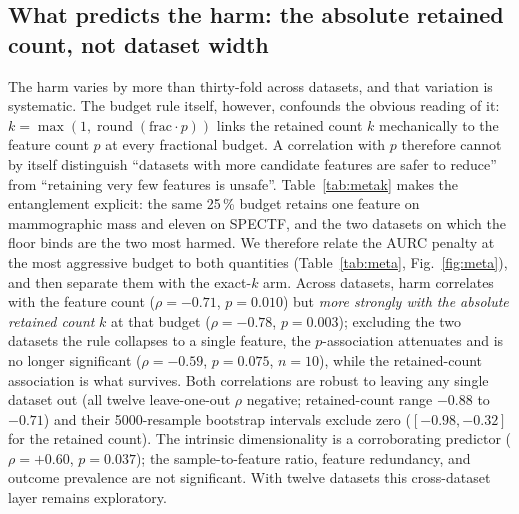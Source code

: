\documentclass[fleqn,10pt]{wlscirep}
\newcommand{\result}[1]{#1}
\begin{document}
\begin{table}[t]
\centering
\caption{The five new reliability axes at 25\,\% of features versus the full-feature model (mean over
twelve datasets, three rankers, three learners; the gaps are over the nine group-bearing datasets---the
ECE, AUROC, and net-benefit gaps over the eight with a valid two-class subgroup, 72 cells, and the
conformal-coverage gap over all nine, 81 cells). Net benefit is a clinical-utility gain ($\uparrow$
better); the others are costs ($\downarrow$ better). Computed from the released per-configuration result summary.}
\label{tab:newaxes}

\end{table}

\subsection{What predicts the harm: the absolute retained count, not dataset width}
\label{sec:metasafe}
The harm varies by more than thirty-fold across datasets, and that variation is systematic. The
budget rule itself, however, confounds the obvious reading of it:
$k=\max(1,\operatorname{round}(\mathrm{frac}\cdot p))$ links the retained count $k$
mechanically to the feature count $p$ at every fractional budget. A correlation with $p$ therefore
cannot by
itself distinguish ``datasets with more candidate features are safer to reduce'' from ``retaining very
few features is unsafe''. Table~\ref{tab:metak} makes the entanglement explicit: the same 25\,\%
budget retains one feature on mammographic mass and eleven on SPECTF, and the two datasets on which
the floor binds are the two most harmed. We therefore relate the AURC penalty at the most aggressive
budget to both quantities (Table~\ref{tab:meta}, Fig.~\ref{fig:meta}), and then separate them with
the exact-$k$ arm.
Across datasets, harm correlates with the feature count ($\rho=\result{-0.71}$, $p=\result{0.010}$)
but \emph{more strongly with the absolute retained count} $k$ at that budget
($\rho=\result{-0.78}$, $p=\result{0.003}$); excluding the two datasets the rule collapses to a single
feature, the $p$-association attenuates and is no longer significant ($\rho=\result{-0.59}$,
$p=\result{0.075}$, $n=10$), while the retained-count association is what survives. Both
correlations are robust to leaving any single dataset out (all twelve leave-one-out $\rho$
negative; retained-count range $\result{-0.88}$ to $\result{-0.71}$) and their 5000-resample bootstrap
intervals exclude zero ($\result{[-0.98, -0.32]}$ for the retained count). The intrinsic dimensionality is a corroborating
predictor ($\rho=\result{+0.60}$, $p=\result{0.037}$); the sample-to-feature ratio, feature
redundancy, and outcome prevalence are not significant. With twelve datasets this cross-dataset layer
remains exploratory.
\end{document}
